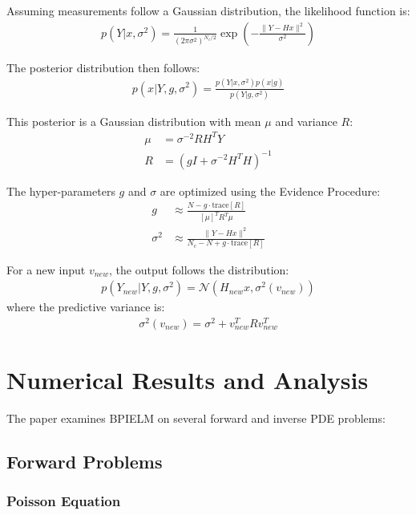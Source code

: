 \documentclass[11pt]{article}
\begin{document}
Assuming measurements follow a Gaussian distribution, the likelihood function is:
\begin{align}
    p(Y|x,\sigma^2) = \frac{1}{(2\pi\sigma^2)^{N_c/2}} \exp\left(-\frac{\|Y-Hx\|^2}{\sigma^2}\right)
\end{align}

The posterior distribution then follows:
\begin{align}
    p(x|Y,g,\sigma^2) = \frac{p(Y|x,\sigma^2)p(x|g)}{p(Y|g,\sigma^2)}
\end{align}

This posterior is a Gaussian distribution with mean $\mu$ and variance $R$:
\begin{align}
    \mu &= \sigma^{-2}RH^TY \\
    R &= (gI + \sigma^{-2}H^TH)^{-1}
\end{align}

The hyper-parameters $g$ and $\sigma$ are optimized using the Evidence Procedure:
\begin{align}
    g &\approx \frac{N-g \cdot \text{trace}[R]}{[\mu]^TR^T\mu} \\
    \sigma^2 &\approx \frac{\|Y-Hx\|^2}{N_c-N+g \cdot \text{trace}[R]}
\end{align}

For a new input $v_{new}$, the output follows the distribution:
\begin{align}
    p(Y_{new}|Y,g,\sigma^2) = \mathcal{N}(H_{new}x, \sigma^2(v_{new}))
\end{align}
where the predictive variance is:
\begin{align}
    \sigma^2(v_{new}) = \sigma^2 + v_{new}^T R v_{new}^T
\end{align}

\section{Numerical Results and Analysis}

The paper examines BPIELM on several forward and inverse PDE problems:

\subsection{Forward Problems}

\subsubsection{Poisson Equation}
\end{document}
